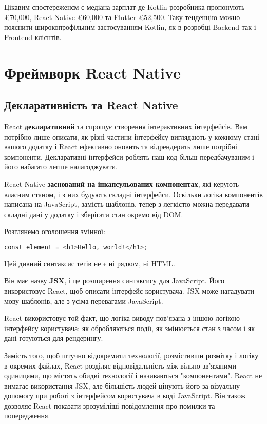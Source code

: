 Цікавим спостереженєм є медіана зарплат де Kotlin розробника пропонують £70,000\cite{kotlin_jobs}, React Native £60,000\cite{react_native_jobs} та Flutter £52,500\cite{flutter_jobs}.
Таку тенденцію можно пояснити широкопрофільним застосуванням Kotlin, як в розробці Backend так і Frontend клієнтів.


\section{Фреймворк React Native}
\label{sec:rn}

\subsection{Декларативність та React Native}
\label{subsec:rn_declarative}

React \textbf{декларативний} та спрощує створення інтерактивних інтерфейсів.
Вам потрібно лише описати, як різні частини інтерфейсу виглядають у кожному стані вашого додатку і React ефективно оновить та відрендерить лише потрібні компоненти.
Декларативні інтерфейси роблять наш код більш передбачуваним і його набагато легше налагоджувати.

React Native \textbf{заснований на інкапсульованих компонентах}, які керують власним станом, і з них будують складні інтерфейси.
Оскільки логіка компонентів написана на JavaScript, замість шаблонів,
тепер з легкістю можна передавати складні дані у додатку і зберігати стан окремо від DOM.

Розглянемо оголошення змінної:
\begin{lstlisting}[style=light, language=Python,label={lst:jsx_hello},caption=JSX Hello World]
const element = <h1>Hello, world!</h1>;
\end{lstlisting}

Цей дивний синтаксис тегів не є ні рядком, ні HTML.

Він має назву \textbf{JSX}, і це розширення синтаксису для JavaScript.
Його використовує React, щоб описати інтерфейс користувача.
JSX може нагадувати мову шаблонів, але з усіма перевагами JavaScript.

React використовує той факт, що логіка виводу пов’язана з іншою логікою інтерфейсу користувача: як обробляються події, як змінюється стан з часом і як дані готуються для рендерингу.

Замість того, щоб штучно відокремити технології, розмістивши розмітку і логіку в окремих файлах, React розділяє відповідальність між вільно зв’язаними одиницями, що містять обидві технології і називаються "компонентами".
React не вимагає використання JSX, але більшість людей цінують його за візуальну допомогу при роботі з інтерфейсом користувача в коді JavaScript.
Він також дозволяє React показати зрозуміліші повідомлення про помилки та попередження.

